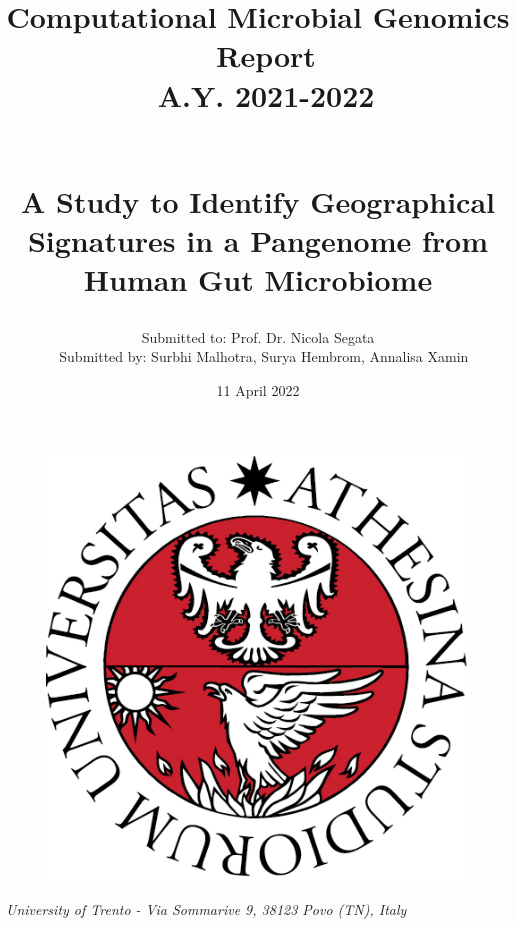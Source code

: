 \documentclass[11pt]{article}
\begin{document}
\title{Computational Microbial Genomics \\\ Report  \\\  A.Y. 2021-2022 \\\ 

A Study to Identify Geographical Signatures in a Pangenome from Human Gut Microbiome} %
\author{\begin {tabular}{c c c}
Submitted to: Prof. Dr. Nicola Segata \\\
\linespread{5}
Submitted by: 
              Surbhi Malhotra,  
              Surya Hembrom, 
              Annalisa Xamin
\end{tabular}}

\date{11 April 2022}  %
\begin{figure}
    \centering
    \includegraphics[width=0.4\columnwidth]{logouni.png}
\end{figure}
\maketitle  %
\vspace*{\fill}
\centerline{\textit{University of Trento - Via Sommarive 9, 38123 Povo (TN), Italy}}
\thispagestyle{empty}


\newpage
\tableofcontents

\thispagestyle{empty}
\newpage
\setcounter{page}{1}


\newpage
\end{document}
